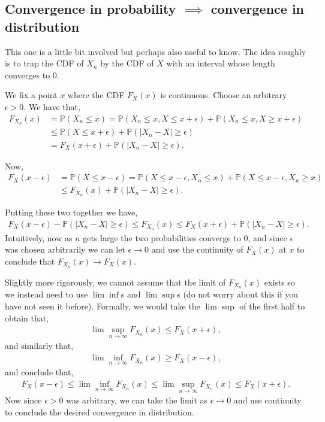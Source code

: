 \documentclass[twoside,12pt]{article}
\begin{document}
\subsection{Convergence in probability $\implies$ convergence in distribution}
This one is a little bit involved but perhaps also useful to know. The idea roughly is to trap the CDF of $X_n$ by the CDF of $X$ with an interval whose length converges to 0. 

We fix a point $x$ where the CDF $F_X(x)$ is continuous. Choose an arbitrary $\epsilon > 0$.
We have that,
\begin{align*}
F_{X_n}(x) &= \mathbb{P}(X_n \leq x) = \mathbb{P}(X_n \leq x, X \leq x+\epsilon) + \mathbb{P}(X_n \leq x, X \geq x+\epsilon) \\
&\leq  \mathbb{P}(X \leq x+\epsilon) + \mathbb{P}(|X_n - X| \geq \epsilon) \\
&= F_{X}(x + \epsilon) + \mathbb{P}(|X_n - X| \geq \epsilon).
\end{align*}

Now, 
\begin{align*}
F_{X}(x - \epsilon) &= \mathbb{P}(X \leq x - \epsilon) = \mathbb{P}(X \leq x - \epsilon, X_n \leq x) +  \mathbb{P}(X \leq x - \epsilon, X_n \geq x) \\
&\leq F_{X_n}(x) + \mathbb{P}(|X_n - X| \geq \epsilon).
\end{align*}

Putting these two together we have,
\begin{align*}
F_{X}(x - \epsilon) - \mathbb{P}(|X_n - X| \geq \epsilon) \leq  F_{X_n}(x) \leq F_{X}(x + \epsilon) + \mathbb{P}(|X_n - X| \geq \epsilon).
\end{align*}
Intuitively, now as $n$ gets large the two probabilities converge to $0$, and since $\epsilon$ was chosen arbitrarily we can let $\epsilon \rightarrow 0$ and use the continuity of $F_X(x)$ at $x$ to conclude that $F_{X_n}(x) \rightarrow F_X(x)$.

Slightly more rigorously, we cannot assume that the limit of $F_{X_n}(x)$ exists so we instead need to use $\lim \inf$s and $\lim \sup$s (do not worry about this if you have not seen it before).
Formally, we would take the $\lim \sup$ of the first half to obtain that,
\begin{align*}
\lim \sup_{n \rightarrow \infty} F_{X_n}(x) \leq F_{X}(x + \epsilon),
\end{align*}
and similarly that,
\begin{align*}
\lim \inf_{n \rightarrow \infty} F_{X_n}(x) \geq F_X(x - \epsilon),
\end{align*}
and conclude that,
\begin{align*}
F_{X}(x - \epsilon)  \leq  \lim \inf_{n \rightarrow \infty} F_{X_n}(x) \leq   \lim \sup_{n \rightarrow \infty} F_{X_n}(x) \leq F_{X}(x + \epsilon).
\end{align*}
Now since $\epsilon > 0$ was arbitrary, we can take the limit as $\epsilon \rightarrow 0$ and use continuity to conclude the desired convergence in distribution.
\end{document}
